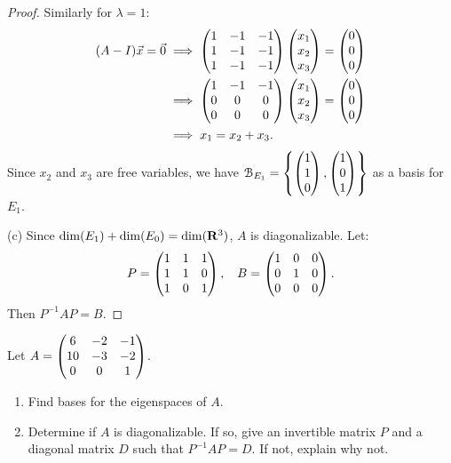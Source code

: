 \documentclass[10pt,twoside,openany]{memoir}
\begin{document}
{\begin{proof}
        Similarly for $\lambda = 1$:
            \begin{equation*}
            \begin{split}
                (A - I)\vec{x} = \vec{0} 
                & \implies \bmat 1 & -1 & -1 \\ 1 & -1 & -1 \\ 1 & -1 & -1 \emat \bmat x_1 \\ x_2 \\ x_3 \emat = \bmat 0 \\ 0 \\ 0 \emat \\
                & \implies \bmat 1 & -1 & -1 \\ 0 & 0 & 0 \\ 0 & 0 & 0 \emat \bmat x_1 \\ x_2 \\ x_3 \emat = \bmat 0 \\ 0 \\ 0 \emat \\
                & \implies x_1 = x_2 + x_3.
            \end{split}
            \end{equation*}
        Since $x_2$ and $x_3$ are free variables, we have $\cB_{E_1} = \left\{ \bmat 1 \\ 1 \\0 \emat, \bmat 1 \\ 0 \\ 1 \emat \right\}$ as a basis for $E_1$.

        (c) Since $\dim(E_1) + \dim(E_0) = \dim(\bfR^3)$, $A$ is diagonalizable. Let:
            \begin{equation*}
            \begin{split}
                P = \bmat 1 & 1 & 1 \\ 1 & 1 & 0 \\ 1 & 0 & 1 \emat, \h9 B = \bmat 1 & 0 & 0 \\ 0 & 1 & 0 \\ 0 & 0 & 0 \emat.
            \end{split}
            \end{equation*}
        Then $P^{-1}AP = B$.
    \end{proof}}
\begin{problem}
Let $A = \bmat 6 & -2 & -1 \\ 10 & -3 & -2 \\ 0 & 0 & 1 \emat$.
\begin{enumerate}[label = (\alph*),itemsep=1pt,topsep=3pt]
    \item Find bases for the eigenspaces of $A$.
    \item Determine if $A$ is diagonalizable. If so, give an invertible matrix $P$ and a diagonal matrix $D$ such that $P^{-1}AP = D$. If not, explain why not.
\end{enumerate}
\end{problem}
\end{document}
